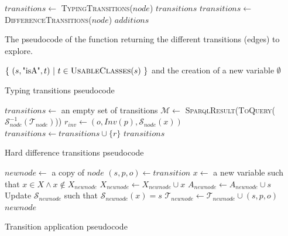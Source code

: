 \documentclass[a4paper,11pt,twoside]{StyleThese}
\begin{document}
\begin{algorithm}[H]
\begin{algorithmic}[1]
\State $transitions\leftarrow$ \textsc{TypingTransitions}($node$)
	\State \Return $transitions$
\EndIf
\State $transitions\leftarrow$ \textsc{DifferenceTransitions}($node$)
\State \Return $additions$
\EndFunction
\end{algorithmic}
 \caption{The pseudocode of the function returning the different transitions (edges) to explore.}
\end{algorithm}

\begin{algorithm}[H]
\begin{algorithmic}[1]
\State \Return $\{\ (s,\text{"isA"},t)\ |\ t \in \textsc{UsableClasses}(s)\ \} $ and the creation of a new variable 
\EndIf
\EndFor
\State \Return $\emptyset$
\EndFunction
\end{algorithmic}
 \caption{Typing transitions pseudocode}
 \label{alg:typingtrans}
\end{algorithm}

\begin{algorithm}[H]
\begin{algorithmic}[1]
\State $transitions\leftarrow$ an empty set of transitions
\State $\mathcal{M}\leftarrow$ \textsc{SparqlResult}(\textsc{ToQuery}($\mathcal{S}_{node}^{-1}(\mathcal{T}_{node})$))
			 \label{line:harddiff}
				\State $r_{inv} \leftarrow (o, Inv(p), \mathcal{S}_{node}(x))$
					\State $transitions \leftarrow transitions \cup \{r\}$
				\EndIf
			\EndFor
		\EndIf
	\EndFor
\EndFor
\State \Return $transitions$
\EndFunction
\end{algorithmic}
 \caption{Hard difference transitions pseudocode}
 \label{alg:harddifftrans}
\end{algorithm}

\begin{algorithm}[H]
\begin{algorithmic}[1]
\State $newnode \leftarrow$ a copy of $node$
\State $(s, p, o) \leftarrow transition$
	\State $x \leftarrow$ a new variable such that $x \in X \land x \notin X_{newnode}$
	\State $X_{newnode} \leftarrow X_{newnode} \cup x$
	\State $A_{newnode} \leftarrow A_{newnode} \cup s$
	\State Update $\mathcal{S}_{newnode}$ such that $\mathcal{S}_{newnode}(x) = s$ \label{line:updatesymboltable}
\EndIf
\State $\mathcal{T}_{newnode} \leftarrow \mathcal{T}_{newnode} \cup (s, p, o)$
\State \Return $newnode$
\EndFunction
\end{algorithmic}
 \caption{Transition application pseudocode}
 \label{alg:transapply}
\end{algorithm}
\end{document}

